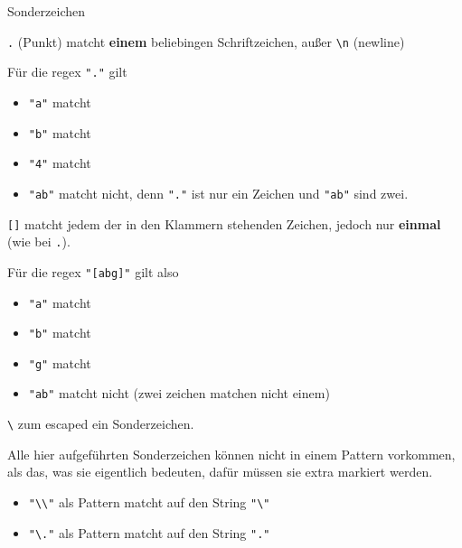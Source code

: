 \documentclass[ignorenonframetext,]{beamer}
\providecommand{\tightlist}{%
  \setlength{\itemsep}{0pt}\setlength{\parskip}{0pt}}
\begin{document}
\begin{frame}{Sonderzeichen}

\texttt{.} (Punkt) matcht \textbf{einem} beliebingen Schriftzeichen,
außer \texttt{\textbackslash{}n} (newline)

Für die regex \texttt{"."} gilt

\begin{itemize}
\tightlist
\item
  \texttt{"a"} matcht
\item
  \texttt{"b"} matcht
\item
  \texttt{"4"} matcht
\item
  \texttt{"ab"} matcht nicht, denn \texttt{"."} ist nur ein Zeichen und
  \texttt{"ab"} sind zwei.
\end{itemize}

\end{frame}

\begin{frame}

\texttt{{[}{]}} matcht jedem der in den Klammern stehenden Zeichen,
jedoch nur \textbf{einmal} (wie bei \texttt{.}).

Für die regex \texttt{"{[}abg{]}"} gilt also

\begin{itemize}
\tightlist
\item
  \texttt{"a"} matcht
\item
  \texttt{"b"} matcht
\item
  \texttt{"g"} matcht
\item
  \texttt{"ab"} matcht nicht (zwei zeichen matchen nicht einem)
\end{itemize}

\end{frame}

\begin{frame}

\texttt{\textbackslash{}} zum escaped ein Sonderzeichen.

Alle hier aufgeführten Sonderzeichen können nicht in einem Pattern
vorkommen, als das, was sie eigentlich bedeuten, dafür müssen sie extra
markiert werden.

\begin{itemize}
\tightlist
\item
  \texttt{"\textbackslash{}\textbackslash{}"} als Pattern matcht auf den
  String \texttt{"\textbackslash{}"}
\item
  \texttt{"\textbackslash{}."} als Pattern matcht auf den String
  \texttt{"."}
\end{itemize}

\end{frame}
\end{document}
